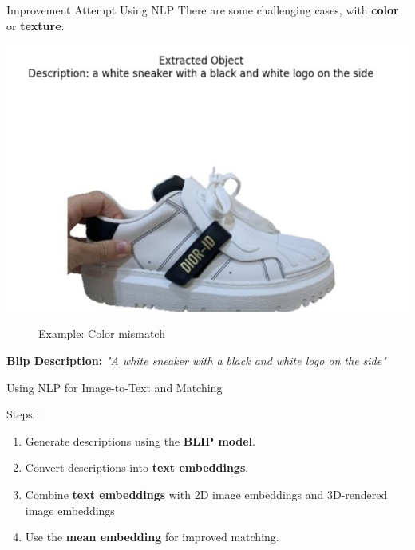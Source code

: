 \documentclass{beamer}
\begin{document}
\begin{frame}{Improvement Attempt Using NLP}
    There are some challenging cases, with \textbf{color} or \textbf{texture}:
    \vspace{0.5cm} %

    \centering
    \begin{minipage}{0.5\textwidth}
        \centering
        \includegraphics[width=\textwidth]{assets/wrongColorShoes.jpg}
    \begin{figure}[h]
        \caption{Example: Color mismatch}
    \end{figure}
    \end{minipage}
    \hfill
    \begin{minipage}{0.45\textwidth}
        \raggedright
        \textbf{Blip Description:}
        \vspace{0.3cm} %
        \textit{"A white sneaker with a black and white logo on the side"}
    \end{minipage}
\end{frame}

\begin{frame}{Using NLP for Image-to-Text and Matching}

Steps : 
    \vspace{0.5cm} %
    \begin{enumerate}
        \item Generate descriptions using the \textbf{BLIP model}.
        \item Convert descriptions into \textbf{text embeddings}.
        \item Combine \textbf{text embeddings} with 2D image embeddings and 3D-rendered image embeddings
        \item Use the \textbf{mean embedding} for improved matching.
    \end{enumerate}
\end{frame}
\end{document}
